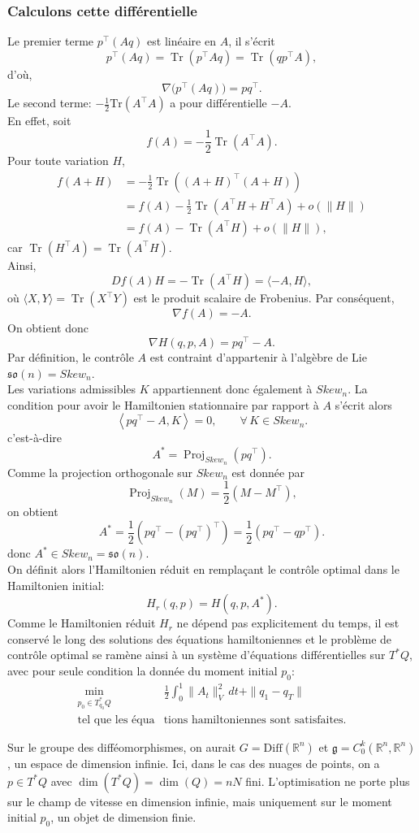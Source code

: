 \documentclass[12pt]{report}
\begin{document}
\subsubsection{Calculons cette différentielle}
Le premier terme $p^{\top}(Aq)$ est linéaire en $A$, il s'écrit
\[
p^{\top}(Aq)=\operatorname{Tr}(p^{\top}Aq)=\operatorname{Tr}(qp^{\top}A),
\]
d'où,
\[
\nabla\bigl(p^{\top}(Aq)\bigr)=pq^{\top}.
\]
Le second terme: $-\frac{1}{2}\mathrm{Tr}(A^{\top}A)$ a pour différentielle $-A$.\\
En effet, soit
\[
f(A)=-\frac{1}{2}\operatorname{Tr}(A^\top A).
\]
Pour toute variation \(H\),
\[
\begin{aligned}
f(A+H)
&=-\frac12\operatorname{Tr}\!\left({(A+H)}^\top(A+H)\right)\\
&=f(A)-\frac12\operatorname{Tr}(A^\top H+H^\top A)+o(\|H\|)\\
&=f(A)-\operatorname{Tr}(A^\top H)+o(\|H\|),
\end{aligned}
\]
car \(\operatorname{Tr}(H^\top A)=\operatorname{Tr}(A^\top H)\).\\
Ainsi,
\[
Df(A)H=-\operatorname{Tr}(A^\top H)=\langle -A,H\rangle,
\]
où \(\langle X,Y\rangle=\operatorname{Tr}(X^\top Y)\) est le produit scalaire de Frobenius. Par conséquent,
\[
\nabla f(A)=-A.
\]
On obtient donc
\[
\nabla H(q,p,A)=pq^\top-A.
\]
Par définition, le contrôle $A$ est contraint d'appartenir à l'algèbre de Lie $\mathfrak{so}(n)=Skew_n$.\\
Les variations admissibles $K$ appartiennent donc également à $Skew_n$. La condition pour avoir le Hamiltonien stationnaire par rapport à $A$ s'écrit alors
\[
\left\langle pq^\top-A,K\right\rangle=0,\qquad \forall\,K\in Skew_n.
\]
c'est-à-dire
\[
A^*=\operatorname{Proj}_{Skew_n}(pq^\top).
\]
Comme la projection orthogonale sur \(Skew_n\) est donnée par
\[
\operatorname{Proj}_{Skew_n}(M)=\frac12(M-M^\top),
\]
on obtient
\[
A^*=\frac12\left(pq^\top-{(pq^\top)}^\top\right)=\frac12\left(pq^\top-qp^\top\right).
\]
donc $A^*\in Skew_n=\mathfrak{so}(n)$.\\
On définit alors l'Hamiltonien réduit en remplaçant le contrôle optimal dans le Hamiltonien initial:
\[
H_r(q,p)=H(q,p,A^*).
\]
Comme le Hamiltonien réduit $H_r$ ne dépend pas explicitement du temps, il est conservé le long des solutions des équations hamiltoniennes et le problème de contrôle optimal se ramène ainsi à un système d'équations différentielles sur $T^*Q$, avec pour seule condition la donnée du moment initial $p_0$:
\[
\begin{aligned}
\min_{p_0\in T_{q_0}^*Q}~&\frac{1}{2}\int_{0}^{1}\|A_t\|_{V}^2\,dt+\|q_1-q_T\|\\
\text{tel que les équa}&\text{tions hamiltoniennes sont satisfaites.}
\end{aligned}
\]
\begin{remark}
Sur le groupe des difféomorphismes, on aurait $G=\mathrm{Diff}(\mathbb{R}^n)$ et $\mathfrak{g}=C_0^k(\mathbb{R}^n,\mathbb{R}^n)$, un espace de dimension infinie. Ici, dans le cas des nuages de points, on a $p\in T^*Q$ avec $\dim(T^*Q)=\dim(Q)=nN$ fini. L'optimisation ne porte plus sur le champ de vitesse en dimension infinie, mais uniquement sur le moment initial $p_0$, un objet de dimension finie.
\end{remark}
\end{document}
